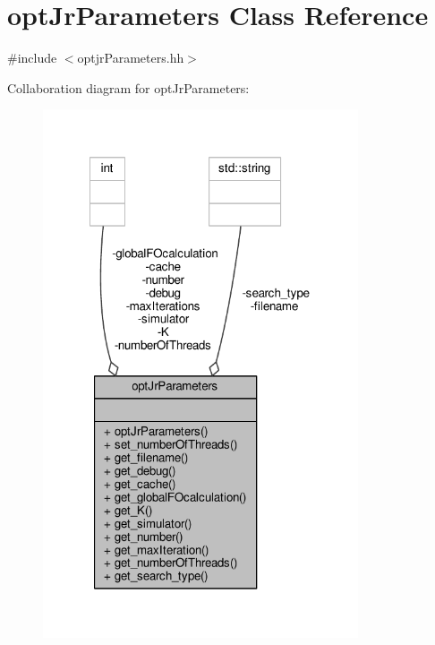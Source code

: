 \hypertarget{classoptJrParameters}{\section{opt\-Jr\-Parameters Class Reference}
\label{classoptJrParameters}
}


{\ttfamily \#include $<$optjr\-Parameters.\-hh$>$}



Collaboration diagram for opt\-Jr\-Parameters\-:
\nopagebreak
\begin{figure}[H]
\begin{center}
\leavevmode
\includegraphics[width=264pt]{classoptJrParameters__coll__graph}
\end{center}
\end{figure}
